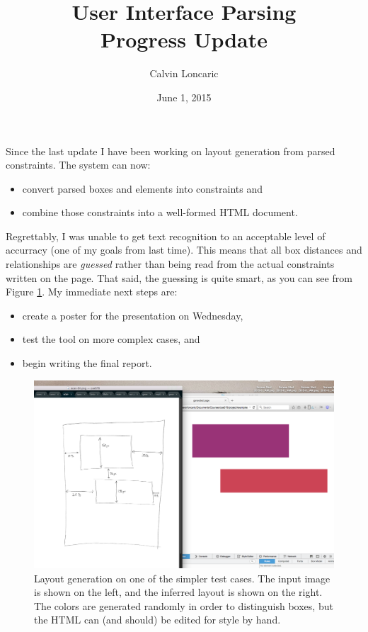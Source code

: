 \documentclass{article}
\title{User Interface Parsing \\ \small{Progress Update}}
\author{Calvin Loncaric}
\date{June 1, 2015}
\begin{document}
\maketitle

\noindent Since the last update I have been working on layout generation from
parsed constraints. The system can now:
\begin{itemize}
\item convert parsed boxes and elements into constraints and
\item combine those constraints into a well-formed HTML document.
\end{itemize}

\noindent Regrettably, I was unable to get text recognition to an acceptable
level of accurracy (one of my goals from last time). This means that all box
distances and relationships are \emph{guessed} rather than being read from the
actual constraints written on the page. That said, the guessing is quite smart,
as you can see from Figure \ref{fig:screenshot}. My immediate next steps are:
\begin{itemize}
\item create a poster for the presentation on Wednesday,
\item test the tool on more complex cases, and
\item begin writing the final report.
\end{itemize}

\begin{figure}
    \includegraphics[width=\textwidth]{progress-2015-06-01-screenshot.png}
    \caption{Layout generation on one of the simpler test cases. The input
    image is shown on the left, and the inferred layout is shown on the right.
    The colors are generated randomly in order to distinguish boxes, but the
    HTML can (and should) be edited for style by hand.}
    \label{fig:screenshot}
\end{figure}
\end{document}
